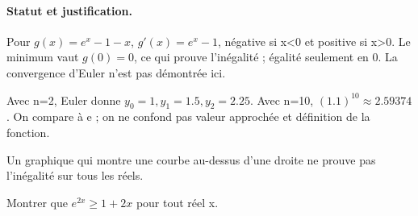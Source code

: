 \paragraph{Statut et justification.} Pour $g(x)=e^x-1-x$, $g\prime(x)=e^x-1$, négative si x<0 et positive si x>0. Le minimum vaut $g(0)=0$, ce qui prouve l’inégalité ; égalité seulement en 0. La convergence d’Euler n’est pas démontrée ici.
\begin{example}Avec n=2, Euler donne $y_0=1,y_1=\num{1,5},y_2=\num{2,25}$. Avec n=10, $(\num{1,1})^{10}\approx\num{2,59374}$. On compare à e ; on ne confond pas valeur approchée et définition de la fonction.\end{example}\label{C09-EX5}
\begin{pitfall}Un graphique qui montre une courbe au-dessus d’une droite ne prouve pas l’inégalité sur tous les réels.\end{pitfall}
\begin{application}Montrer que $e^{2x}\geq1+2x$ pour tout réel x.\end{application}\label{C09-AP5}
\mxnewpage
